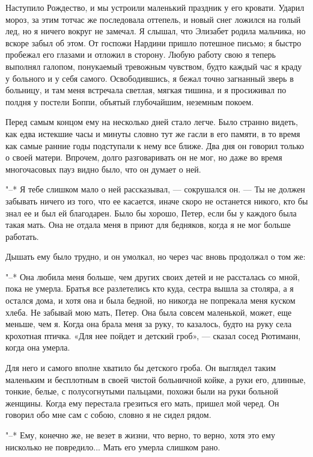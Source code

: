 Наступило Рождество, и  мы устроили маленький праздник  у его кровати.
Ударил мороз,  за этим  тотчас же последовала  оттепель, и  новый снег
ложился на  голый лед, но  я ничего вокруг  не замечал. Я  слышал, что
Элизабет родила мальчика, но вскоре  забыл об этом. От госпожи Нардини
пришло  потешное письмо;  я быстро  пробежал его  глазами и  отложил в
сторону.  Любую  работу свою  я  теперь  выполнял галопом,  понукаемый
тревожным  чувством, будто  каждый час  я краду  у больного  и у  себя
самого. Освободившись, я бежал точно загнанный зверь в больницу, и там
меня  встречала светлая,  мягкая тишина,  и я  просиживал по  полдня у
постели Боппи, объятый глубочайшим, неземным покоем.

Перед самым  концом ему  на несколько дней  стало легче.  Было странно
видеть, как  едва истекшие  часы и  минуты словно тут  же гасли  в его
памяти, в то время как самые  ранние годы подступали к нему все ближе.
Два дня он говорил только о своей матери. Впрочем, долго разговаривать
он  не мог,  но даже  во время  многочасовых пауз  видно было,  что он
думает о ней.

"--* Я тебе слишком мало о  ней рассказывал, --- сокрушался он. --- Ты
не должен  забывать ничего из  того, что  ее касается, иначе  скоро не
останется никого, кто бы знал ее  и был ей благодарен. Было бы хорошо,
Петер, если бы у  каждого была такая мать. Она не  отдала меня в приют
для бедняков, когда я не мог больше работать.

Дышать ему было  трудно, и он умолкал, но через  час вновь продолжал о
том же:

"--* Она любила меня больше, чем других своих детей и не рассталась со
мной, пока не умерла. Братья все разлетелись кто куда, сестра вышла за
столяра, а  я остался дома,  и хотя она и  была бедной, но  никогда не
попрекала  меня куском  хлеба. Не  забывай мою  мать, Петер.  Она была
совсем маленькой,  может, еще меньше, чем  я. Когда она брала  меня за
руку,  то казалось,  будто на  руку  села крохотная  птичка. «Для  нее
пойдет и детский гроб», --- сказал сосед Рютиманн, когда она умерла.

Для него и самого вполне хватило  бы детского гроба. Он выглядел таким
маленьким и  бесплотным в своей  чистой больничной койке, а  руки его,
длинные, тонкие, белые, с полусогнутыми  пальцами, похожи были на руки
больной женщины.  Когда ему перестала  грезиться его мать,  пришел мой
черед. Он говорил обо мне сам с собою, словно я не сидел рядом.

"--* Ему, конечно же, не везет в  жизни, что верно, то верно, хотя это
ему нисколько не повредило... Мать его умерла слишком рано.

